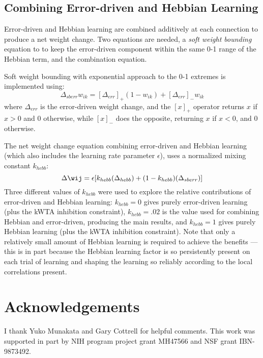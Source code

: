 \documentclass[12pt,twoside]{article}
\begin{document}
\subsection{Combining Error-driven and Hebbian Learning} 

Error-driven and Hebbian learning are combined additively at each
connection to produce a net weight change.  Two equations are needed,
a {\em soft weight bounding} equation to to keep the error-driven
component within the same 0-1 range of the Hebbian term, and the
combination equation.

Soft weight bounding with exponential approach to the 0-1 extremes is
implemented using:
\begin{equation}
  \Delta_{sberr} w_{ik} = [\Delta_{err}]_+ (1-w_{ik}) + [\Delta_{err}]_- w_{ik}
  \label{eq.err_soft_bound}
\end{equation}
where $\Delta_{err}$ is the error-driven weight change, and the $[x]_+$
operator returns $x$ if $x>0$ and $0$ otherwise, while $[x]_-$ does
the opposite, returning $x$ if $x<0$, and $0$ otherwise.

The net weight change equation combining error-driven and Hebbian
learning (which also includes the learning rate parameter $\epsilon$),
uses a normalized mixing constant $k_{hebb}$:
\begin{equation}
  \Delta \wij = \epsilon[k_{hebb} (\Delta_{hebb}) + (1-k_{hebb}) (\Delta_{sberr})]
  \label{eq.k_hebb}
\end{equation}
Three different values of $k_{hebb}$ were used to explore the relative
contributions of error-driven and Hebbian learning: $k_{hebb} = 0$
gives purely error-driven learning (plus the kWTA inhibition
constraint), $k_{hebb} = .02$ is the value used for combining Hebbian
and error-driven, producing the main results, and $k_{hebb} = 1$ gives
purely Hebbian learning (plus the kWTA inhibition constraint).  Note
that only a relatively small amount of Hebbian learning is required to
achieve the benefits --- this is in part because the Hebbian learning
factor is so persistently present on each trial of learning and
shaping the learning so reliably according to the local correlations
present. 

\section*{Acknowledgements}

I thank Yuko Munakata and Gary Cottrell for helpful comments.  This
work was supported in part by NIH program project grant MH47566 and
NSF grant IBN-9873492.

\newpage


\end{document}
